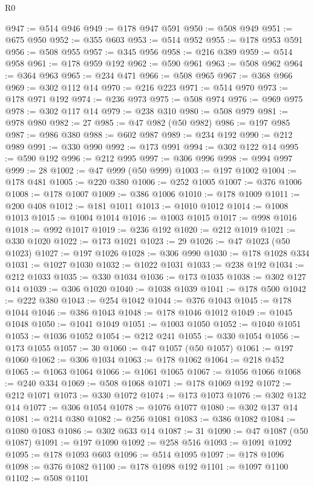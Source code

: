 \begin{lexlean}{R0}
\begin{coremodule}
@947 := @514 @946
@949 := @178 @947 @591
@950 := @508 @949
@951 := @675 @950
@952 := @355 @603
@953 := @514 @952
@955 := @178 @953 @591
@956 := @508 @955
@957 := @345 @956
@958 := @216 @389
@959 := @514 @958
@961 := @178 @959 @192
@962 := @590 @961
@963 := @508 @962
@964 := @364 @963
@965 := @234 @471
@966 := @508 @965
@967 := @368 @966
@969 := @302 @112 @14
@970 := @216 @223
@971 := @514 @970
@973 := @178 @971 @192
@974 := @236 @973
@975 := @508 @974
@976 := @969 @975
@978 := @302 @117 @14
@979 := @238 @310
@980 := @508 @979
@981 := @978 @980
@982 := 27
@985 := @47 @982 (@50 @982)
@986 := @197 @985
@987 := @986 @380
@988 := @602 @987
@989 := @234 @192
@990 := @212 @989
@991 := @330 @990
@992 := @173 @991
@994 := @302 @122 @14
@995 := @590 @192
@996 := @212 @995
@997 := @306 @996
@998 := @994 @997
@999 := 28
@1002 := @47 @999 (@50 @999)
@1003 := @197 @1002
@1004 := @178 @481
@1005 := @220 @380
@1006 := @252 @1005
@1007 := @376 @1006
@1008 := @178 @1007
@1009 := @386 @1006
@1010 := @178 @1009
@1011 := @200 @408
@1012 := @181 @1011
@1013 := @1010 @1012
@1014 := @1008 @1013
@1015 := @1004 @1014
@1016 := @1003 @1015
@1017 := @998 @1016
@1018 := @992 @1017
@1019 := @236 @192
@1020 := @212 @1019
@1021 := @330 @1020
@1022 := @173 @1021
@1023 := 29
@1026 := @47 @1023 (@50 @1023)
@1027 := @197 @1026
@1028 := @306 @990
@1030 := @178 @1028 @334
@1031 := @1027 @1030
@1032 := @1022 @1031
@1033 := @238 @192
@1034 := @212 @1033
@1035 := @330 @1034
@1036 := @173 @1035
@1038 := @302 @127 @14
@1039 := @306 @1020
@1040 := @1038 @1039
@1041 := @178 @500
@1042 := @222 @380
@1043 := @254 @1042
@1044 := @376 @1043
@1045 := @178 @1044
@1046 := @386 @1043
@1048 := @178 @1046 @1012
@1049 := @1045 @1048
@1050 := @1041 @1049
@1051 := @1003 @1050
@1052 := @1040 @1051
@1053 := @1036 @1052
@1054 := @212 @241
@1055 := @330 @1054
@1056 := @173 @1055
@1057 := 30
@1060 := @47 @1057 (@50 @1057)
@1061 := @197 @1060
@1062 := @306 @1034
@1063 := @178 @1062
@1064 := @218 @452
@1065 := @1063 @1064
@1066 := @1061 @1065
@1067 := @1056 @1066
@1068 := @240 @334
@1069 := @508 @1068
@1071 := @178 @1069 @192
@1072 := @212 @1071
@1073 := @330 @1072
@1074 := @173 @1073
@1076 := @302 @132 @14
@1077 := @306 @1054
@1078 := @1076 @1077
@1080 := @302 @137 @14
@1081 := @214 @380
@1082 := @256 @1081
@1083 := @386 @1082
@1084 := @1080 @1083
@1086 := @302 @633 @14
@1087 := 31
@1090 := @47 @1087 (@50 @1087)
@1091 := @197 @1090
@1092 := @258 @516
@1093 := @1091 @1092
@1095 := @178 @1093 @603
@1096 := @514 @1095
@1097 := @178 @1096
@1098 := @376 @1082
@1100 := @178 @1098 @192
@1101 := @1097 @1100
@1102 := @508 @1101

\end{coremodule}
\end{lexlean}
